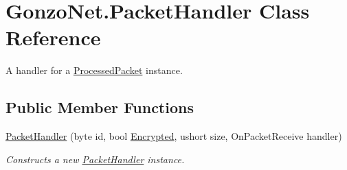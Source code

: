 \hypertarget{class_gonzo_net_1_1_packet_handler}{\section{Gonzo\+Net.\+Packet\+Handler Class Reference}
\label{class_gonzo_net_1_1_packet_handler}
}


A handler for a \hyperlink{class_gonzo_net_1_1_processed_packet}{Processed\+Packet} instance.  


\subsection*{Public Member Functions}
\begin{DoxyCompactItemize}
\item 
\hyperlink{class_gonzo_net_1_1_packet_handler_ae7aa47116bb967b3d6050ad52594f5a3}{Packet\+Handler} (byte id, bool \hyperlink{class_gonzo_net_1_1_packet_handler_a874391e7467f18ccac385fdfe5e51f96}{Encrypted}, ushort size, On\+Packet\+Receive handler)
\begin{DoxyCompactList}\small\item\em Constructs a new \hyperlink{class_gonzo_net_1_1_packet_handler}{Packet\+Handler} instance. \end{DoxyCompactList}\end{DoxyCompactItemize}
